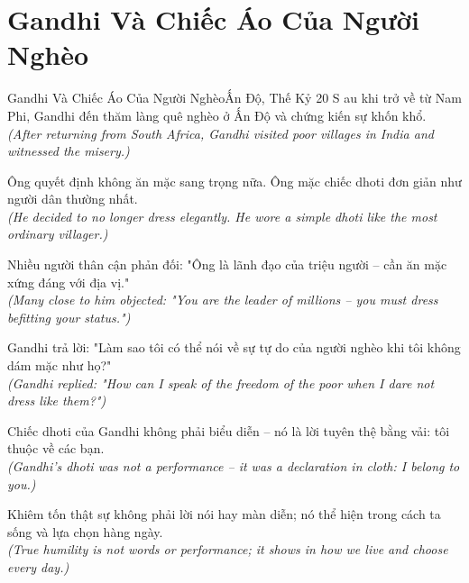 \section{Gandhi Và Chiếc Áo Của Người Nghèo}
\begin{truyen}{Gandhi Và Chiếc Áo Của Người Nghèo}{Ấn Độ, Thế Kỷ 20}
S au khi trở về từ Nam Phi, Gandhi đến thăm làng quê nghèo ở Ấn Độ và chứng kiến sự khốn khổ.\\
\textit{(After returning from South Africa, Gandhi visited poor villages in India and witnessed the misery.)}

Ông quyết định không ăn mặc sang trọng nữa. Ông mặc chiếc dhoti đơn giản như người dân thường nhất.\\
\textit{(He decided to no longer dress elegantly. He wore a simple dhoti like the most ordinary villager.)}

Nhiều người thân cận phản đối: "Ông là lãnh đạo của triệu người -- cần ăn mặc xứng đáng với địa vị."\\
\textit{(Many close to him objected: "You are the leader of millions -- you must dress befitting your status.")}

Gandhi trả lời: "Làm sao tôi có thể nói về sự tự do của người nghèo khi tôi không dám mặc như họ?"\\
\textit{(Gandhi replied: "How can I speak of the freedom of the poor when I dare not dress like them?")}

Chiếc dhoti của Gandhi không phải biểu diễn -- nó là lời tuyên thệ bằng vải: tôi thuộc về các bạn.\\
\textit{(Gandhi's dhoti was not a performance -- it was a declaration in cloth: I belong to you.)}

\end{truyen}
\begin{baihoc}
  Khiêm tốn thật sự không phải lời nói hay màn diễn; nó thể hiện trong cách ta sống và lựa chọn hàng ngày.\\
  \textit{(True humility is not words or performance; it shows in how we live and choose every day.)}
\end{baihoc}

